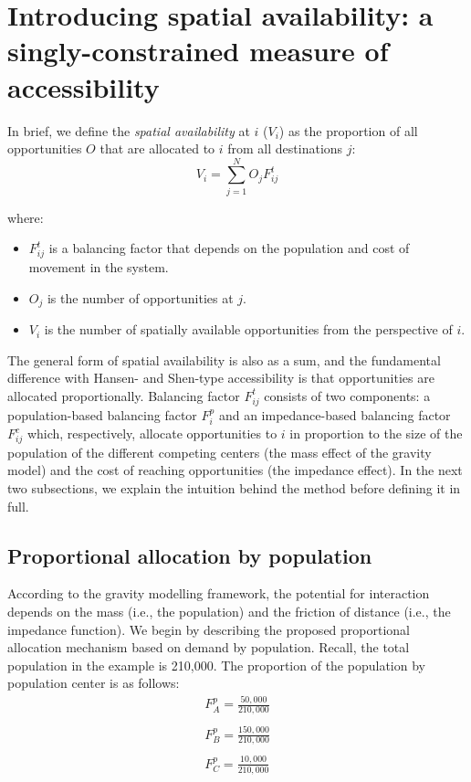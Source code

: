 \documentclass[10pt,letterpaper]{article}
\providecommand{\tightlist}{%
  \setlength{\itemsep}{0pt}\setlength{\parskip}{0pt}}
\begin{document}
\hypertarget{introducing-spatial-availability-a-singly-constrained-measure-of-accessibility}{%
\section{Introducing spatial availability: a singly-constrained measure
of
accessibility}\label{introducing-spatial-availability-a-singly-constrained-measure-of-accessibility}}

In brief, we define the \emph{spatial availability} at \(i\) (\(V_{i}\))
as the proportion of all opportunities \(O\) that are allocated to \(i\)
from all destinations \(j\): \[
V_i = \sum_{j=1}^NO_jF^t_{ij}
\]

\noindent where:

\begin{itemize}
\tightlist
\item
  \(F^t_{ij}\) is a balancing factor that depends on the population and
  cost of movement in the system.
\item
  \(O_j\) is the number of opportunities at \(j\).
\item
  \(V_i\) is the number of spatially available opportunities from the
  perspective of \(i\).
\end{itemize}

The general form of spatial availability is also as a sum, and the
fundamental difference with Hansen- and Shen-type accessibility is that
opportunities are allocated proportionally. Balancing factor
\(F^t_{ij}\) consists of two components: a population-based balancing
factor \(F^p_{i}\) and an impedance-based balancing factor \(F^c_{ij}\)
which, respectively, allocate opportunities to \(i\) in proportion to
the size of the population of the different competing centers (the mass
effect of the gravity model) and the cost of reaching opportunities (the
impedance effect). In the next two subsections, we explain the intuition
behind the method before defining it in full.

\hypertarget{proportional-allocation-by-population}{%
\subsection{Proportional allocation by
population}\label{proportional-allocation-by-population}}

According to the gravity modelling framework, the potential for
interaction depends on the mass (i.e., the population) and the friction
of distance (i.e., the impedance function). We begin by describing the
proposed proportional allocation mechanism based on demand by
population. Recall, the total population in the example is 210,000. The
proportion of the population by population center is as follows: \[
\begin{array}{l}
F^p_A = \frac{50,000}{210,000}\\
\\
F^p_B = \frac{150,000}{210,000}\\
\\
F^p_C = \frac{10,000}{210,000}\\
\end{array}
\]
\end{document}
